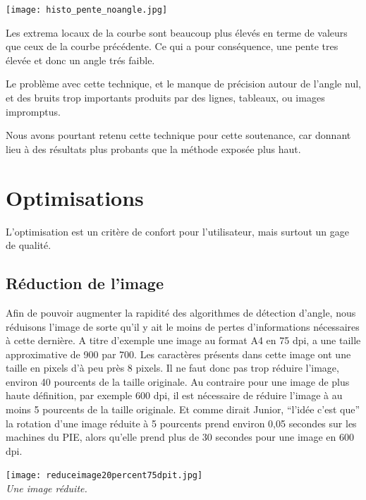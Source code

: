 \documentclass[a4paper,12pt]{report}
\begin{document}
\begin{center}
	
	\texttt{[image: histo\_pente\_noangle.jpg]}\\
\end{center}

Les extrema locaux de la courbe sont beaucoup plus \'elev\'es en
terme de valeurs que ceux de la courbe pr\'ec\'edente. Ce qui a pour
cons\'equence, une pente tres \'elev\'ee et donc un angle tr\'es faible.

Le probl\`eme avec cette technique, et le manque de pr\'ecision autour
de l'angle nul, et des bruits trop importants produits par des lignes,
tableaux, ou images impromptus.

Nous avons pourtant retenu cette technique pour cette soutenance, car
donnant lieu \`a des r\'esultats plus probants que la m\'ethode expos\'ee
plus haut.

\section{ Optimisations  }
 L'optimisation est un crit\`ere de confort pour l'utilisateur, mais
 surtout un gage de qualit\'e.
\subsection{ R\'eduction de l'image }
 Afin de pouvoir augmenter la rapidit\'e des algorithmes de d\'etection
 d'angle, nous r\'eduisons l'image de sorte qu'il y ait le moins de
 pertes d'informations n\'ecessaires \`a cette derni\`ere. A titre
 d'exemple une image au format A4 en 75 dpi, a une taille approximative
 de 900 par 700. Les caract\`eres pr\'esents dans cette image ont une
 taille en pixels d'\`a peu pr\`es 8 pixels. Il ne faut donc pas trop
 r\'eduire l'image, environ 40 pourcents de la taille originale. Au
 contraire pour une image de plus haute d\'efinition, par exemple 600
 dpi, il est n\'ecessaire de r\'eduire l'image \`a au moins 5 pourcents
 de la taille originale. Et comme dirait Junior, ``l'id\'ee c'est
 que'' la rotation d'une image r\'eduite \`a 5 pourcents prend environ
 0,05 secondes sur les machines du PIE, alors qu'elle prend plus de 30
 secondes pour une image en 600 dpi.

\begin{center}
	
	\texttt{[image: reduceimage20percent75dpit.jpg]}\\
	\caption{\emph{Une image r\'eduite.}}
\end{center}
 
\end{document}
